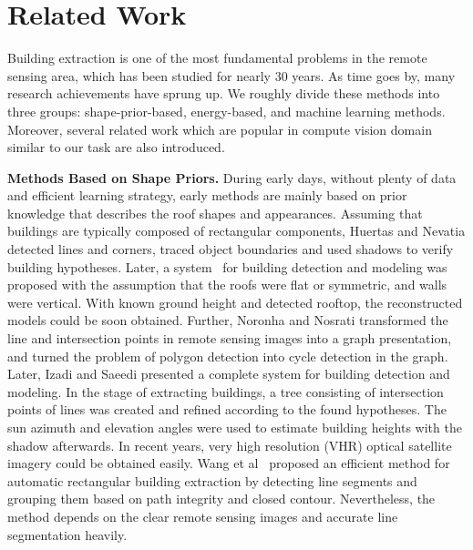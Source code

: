 \section{Related Work}
\label{Sec:RelatedWork}


Building extraction is one of the most fundamental problems in the remote sensing area, which has been studied for nearly 30 years.
As time goes by, many research achievements have sprung up.
We roughly divide these methods into three groups: shape-prior-based, energy-based, and machine learning methods. 
Moreover, several related work which are popular in compute vision domain similar to our task are also introduced.
 
 
\noindent\textbf{Methods Based on Shape Priors.} 
During early days, without plenty of data and efficient learning strategy, early methods are mainly based on prior knowledge that describes the roof shapes and appearances.
%
Assuming that buildings are typically composed of rectangular components,
Huertas and Nevatia \cite{IEEEexample:huertas1988detecting} detected lines and corners, traced object boundaries and used shadows to verify building hypotheses.
%
Later, a system~\cite{IEEEexample:noronha2001detection} for building detection and modeling was proposed with the assumption that the roofs were flat or symmetric, and walls were vertical.
With known ground height and detected rooftop, the reconstructed models could be soon obtained.
Further, Noronha and Nosrati \cite{IEEEexample:nosrati2009novel} transformed the line and intersection points in remote sensing images into a graph presentation, and turned the problem of polygon detection into cycle detection in the graph.
Later, Izadi and Saeedi\cite{IEEEexample:izadi2012three} presented a complete system for building detection and modeling. 
In the stage of extracting buildings, a tree consisting of intersection points of lines was created and refined according to the found hypotheses.
The sun azimuth and elevation angles were used to estimate building heights with the shadow afterwards.
In recent years, very high resolution (VHR) optical satellite imagery could be obtained easily.
Wang et al~\cite{IEEEexample:wang2015efficient} proposed an efficient method for automatic rectangular building extraction by detecting line segments and grouping them based on path integrity and closed contour. Nevertheless, the method depends on the clear remote sensing images and accurate line segmentation heavily. 



